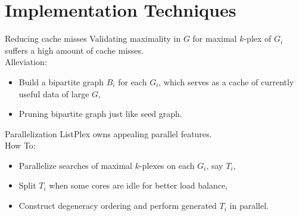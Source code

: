 \documentclass[9pt,notheorems]{beamer} %
\begin{document}
\section{Implementation Techniques}
\begin{frame}{Reducing cache misses}
    Validating maximality in $G$ for maximal $k$-plex of $G_i$ suffers a high amount of cache misses.\\
    \vspace{0.5cm}
    Alleviation:\\
    \begin{itemize}
    \item Build a bipartite graph $B_i$ for each $G_i$, which serves as a cache of currently useful data of large $G$,
    \item Pruning bipartite graph just like seed graph.
    \end{itemize}
\end{frame}
\begin{frame}{Parallelization}
    ListPlex owns appealing parallel features.\\
    \vspace{0.5cm}
    How To:\\
    \begin{itemize}
        \item Parallelize searches of maximal $k$-plexes on each $G_i$, say $T_i$,
        \item Split $T_i$ when some cores are idle for better load balance,
        \item Construct degeneracy ordering and perform generated $T_i$ in parallel. 
    \end{itemize}
\end{frame}
\end{document}
